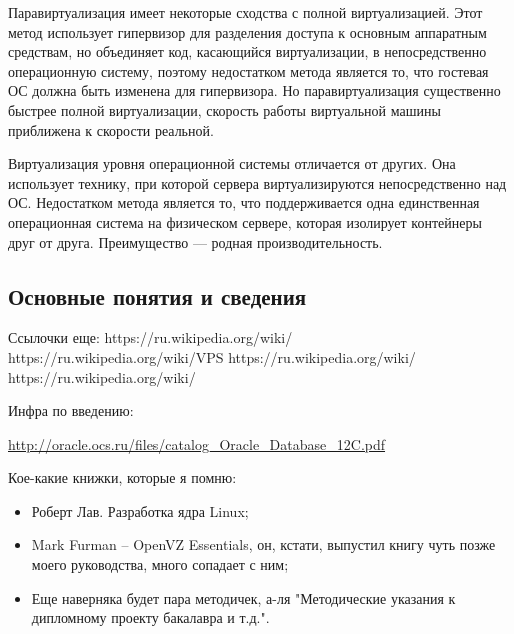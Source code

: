 Паравиртуализация имеет некоторые сходства с полной виртуализацией.
Этот метод использует гипервизор для разделения доступа к основным аппаратным средствам, но объединяет код, касающийся виртуализации, в непосредственно операционную систему, поэтому недостатком метода является то, что гостевая ОС должна быть изменена для гипервизора.
Но паравиртуализация существенно быстрее полной виртуализации, скорость работы виртуальной машины приближена к скорости реальной.

Виртуализация уровня операционной системы отличается от других.
Она использует технику, при которой сервера виртуализируются непосредственно над ОС.
Недостатком метода является то, что поддерживается одна единственная операционная система на физическом сервере, которая изолирует контейнеры друг от друга.
Преимущество --- родная производительность.


\iffalse
\subsection{Основные понятия и сведения}

Ссылочки еще:
https://ru.wikipedia.org/wiki/%
https://ru.wikipedia.org/wiki/VPS
https://ru.wikipedia.org/wiki/%
https://ru.wikipedia.org/wiki/%

Инфра по введению:

\url{http://oracle.ocs.ru/files/catalog_Oracle_Database_12C.pdf}


Кое-какие книжки, которые я помню:
\begin{itemize}
    \item Роберт Лав. Разработка ядра Linux;
    \item Mark Furman -- OpenVZ Essentials, он, кстати, выпустил книгу чуть позже моего руководства, много сопадает с ним;
    \item Еще наверняка будет пара методичек, а-ля "Методические указания к дипломному проекту бакалавра и т.д.".
\end{itemize}

